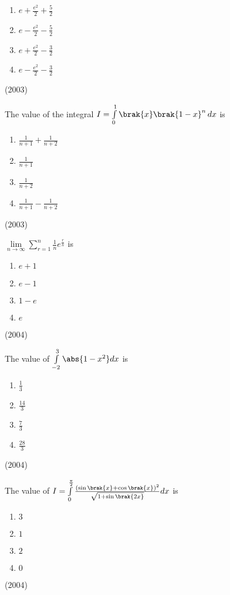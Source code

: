 			\begin {enumerate}
				\itemsep0.4em
				\item $e+ \frac{e^2}{2} + \frac{5}{2}$
				\item $e- \frac{e^2}{2} - \frac{5}{2}$
				\item $e+ \frac{e^2}{2} - \frac{3}{2}$
				\item $e- \frac{e^2}{2} - \frac{3}{2}$
			\end {enumerate}
			\hfill (2003)
	\item
		The value of the integral $I = \int \limits_0^1 \brak{x}\brak{1-x}^n \, dx$ is
			\begin{enumerate}
				\itemsep0.5em
				\item $\frac{1}{n+1} + \frac{1}{n+2}$
				\item $\frac{1}{n+1}$
				\item $\frac{1}{n+2}$
				\item $\frac{1}{n+1} - \frac{1}{n+2}$
			\end{enumerate}
			\hfill (2003)
	\item
		$\lim \limits_{n \to \infty} \sum \limits_{r=1}^{n} \frac{1}{n} e^{\frac{r}{n}}$ is
			\begin{enumerate}
				\item $e+1$
				\item $e-1$
				\item $1-e$
				\item $e$	
			\end{enumerate}
			\hfill (2004)
	\item 
		The value of $\int \limits_{-2}^{3} \abs{1-x^2}dx$ is 
			\begin{enumerate}
				\itemsep0.4em
				\item $\frac{1}{3}$
				\item $\frac{14}{3}$
				\item $\frac{7}{3}$
				\item $\frac{28}{3}$
			\end{enumerate}
			\hfill (2004)
	\item
		The value of $I = \int \limits_0^{\frac{\pi}{2}} \frac{(\sin \brak{x} + \cos \brak{x})^2}{\sqrt{1+ \sin \brak{2x}}} dx$ is
			\begin{enumerate}
				\item $3$
				\item $1$
				\item $2$
				\item $0$
			\end{enumerate}
			\hfill (2004)
